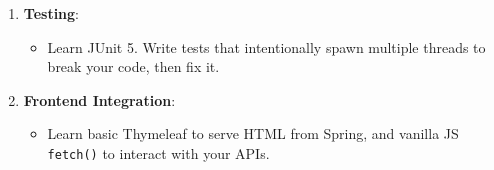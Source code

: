 \documentclass[11pt, a4paper]{article}
\begin{document}
\begin{enumerate}
    \begin{itemize}
        \item Study Idempotency keys.
        \item Study the Gossip Protocol and Time-To-Live (TTL) networks.
    \end{itemize}
    \item \textbf{Testing}:
    \begin{itemize}
        \item Learn JUnit 5. Write tests that intentionally spawn multiple threads to break your code, then fix it.
    \end{itemize}
    \item \textbf{Frontend Integration}:
    \begin{itemize}
        \item Learn basic Thymeleaf to serve HTML from Spring, and vanilla JS \texttt{fetch()} to interact with your APIs.
    \end{itemize}
\end{enumerate}
\end{document}
